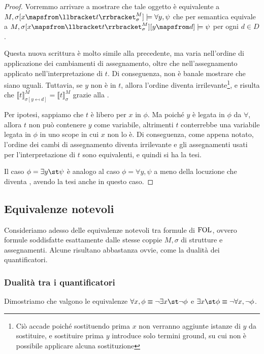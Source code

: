 \begin{proof}
  Vorremmo arrivare a mostrare che tale oggetto è equivalente a \(M,\sigma[x\mapsfrom \den{t}[M][\sigma]]\models \forall y,\psi\) che per semantica equivale a \(M,\sigma[x\mapsfrom \den{t}[M][\sigma]][y\mapsfrom d]\models \psi\) per ogni \(d \in D\).
  
  Questa nuova scrittura è molto simile alla precedente, ma varia nell'ordine di applicazione dei cambiamenti di assegnamento, oltre che nell'assegnamento applicato nell'interpretazione di \(t\). Di conseguenza, non è banale mostrare che siano uguali. Tuttavia, se \(y\) non è in \(t\), allora l'ordine diventa irrilevante\footnote{Ciò accade poiché sostituendo prima \(x\) non verranno aggiunte istanze di \(y\) da sostituire, e sostituire prima \(y\) introduce solo termini ground, su cui non è possibile applicare alcuna sostituzione}, e risulta che \(\llbracket t\rrbracket^M_{\sigma[y\mapsfrom d]} = \llbracket t\rrbracket^M_{\sigma}\) grazie alla .

  Per ipotesi, sappiamo che \(t\) è libero per \(x\) in \(\phi\). Ma poiché \(y\) è legata in \(\phi\) da \(\forall\), allora \(t\) non può contenere \(y\) come variabile, altrimenti \(t\) conterrebbe una variabile legata in \(\phi\) in uno scope in cui \(x\) non lo è. Di conseguenza, come appena notato, l'ordine dei cambi di assegnamento diventa irrilevante e gli assegnamenti usati per l'interpretazione di \(t\) sono equivalenti, e quindi si ha la tesi.

  Il caso \(\phi = \exists y\st \psi\) è analogo al caso \(\phi = \forall y, \psi\) a meno della locuzione  che diventa , avendo la tesi anche in questo caso.
\end{proof}


\subsection{Equivalenze notevoli}

Consideriamo adesso delle equivalenze notevoli tra formule di \(\FOL\), ovvero formule soddisfatte esattamente dalle stesse coppie \(M, \sigma\) di strutture e assegnamenti.
Alcune risultano abbastanza ovvie, come la dualità dei quantificatori.

\subsubsection{Dualità tra i quantificatori}
Dimostriamo che valgono le equivalenze \(\forall x,\phi \equiv \neg \exists x\st \neg \phi\) e \(\exists x\st \phi \equiv \neg\forall x, \neg \phi\).

